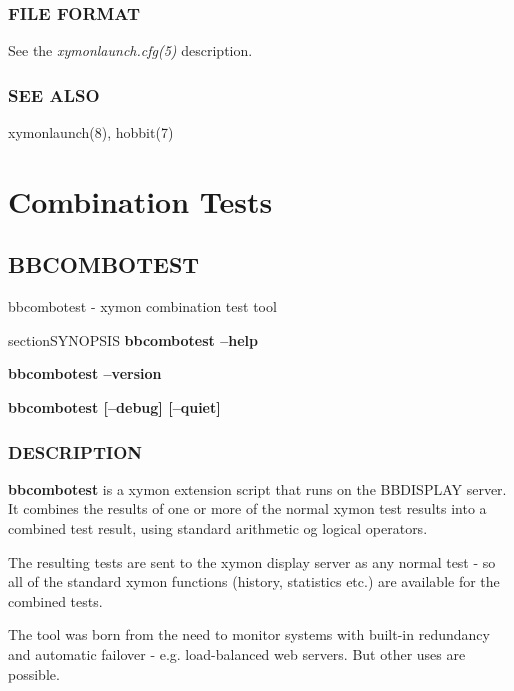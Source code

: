  
\subsection{FILE FORMAT}
 See the \emph{xymonlaunch.cfg(5)}
 description. 

 
\subsection{SEE ALSO}
xymonlaunch(8), hobbit(7) 


%
\chapter{Combination Tests}

\newpage
\section{BBCOMBOTEST}
 bbcombotest - xymon combination test tool \

section{SYNOPSIS}
\textbf{bbcombotest --help}
 
\textbf{bbcombotest --version}
 
\textbf{bbcombotest [--debug] [--quiet]}


 
\subsection{DESCRIPTION}
\textbf{bbcombotest} is a xymon extension script that runs on the
BBDISPLAY server. It combines the results of one or more of the normal
xymon test results into a combined test result, using standard
arithmetic og logical operators. 


  The resulting tests are sent to the xymon display server as any
  normal test - so all of the standard xymon functions (history,
  statistics etc.) are available for the combined tests. 



  The tool was born from the need to monitor systems with built-in
  redundancy and automatic failover - e.g. load-balanced web
  servers. But other uses are possible. 



 
